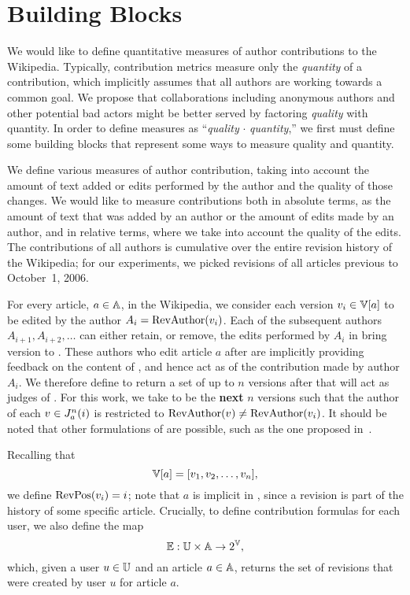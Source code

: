 \section{Building Blocks}

We would like to define quantitative measures of author 
contributions to the Wikipedia.
Typically, contribution metrics measure only the
\textit{quantity} of a contribution,
which implicitly assumes that all authors
are working towards a common goal.
We propose that collaborations including anonymous
authors and other potential bad actors might be better served by factoring
\textit{quality} with quantity.
In order to define measures as
``\textit{quality} $\cdot$ \textit{quantity},''
we first must define some building blocks that represent
some ways to measure quality and quantity.

We define various measures of author contribution, taking into
account the amount of text added or edits performed by the author
and the quality of those changes.
We would like to measure contributions both in absolute terms,
as the amount of text that was added by an author or the
amount of edits made by an author, and in relative terms, 
where we take into account the quality of the edits.
The contributions of all authors is cumulative over the 
entire revision history of the Wikipedia;
for our experiments, we picked revisions of all articles
previous to October~1, 2006.

For every article, $a \in \mathbb{A}$, in the Wikipedia,
we consider each version $\version{i} \in \versions{a}$
to be edited by the author $A_i = \mathrm{RevAuthor}(v_{i})$.
Each of the subsequent authors $A_{i+1}, A_{i+2}, \ldots$ can either
retain, or remove, the edits performed by $A_i$ in bring
version  to .
These authors who edit article $a$ after 
are implicitly providing feedback on the content of , and hence
act as  of the contribution made by author $A_i$.
We therefore define  to return a set of up to $n$ versions
after  that will act as judges of .
For this work, we take  to be the \textbf{next} $n$
versions such that the author of each $v_{} \in J_{a}^{n}(i)$
is restricted to $\mathrm{RevAuthor}(v_{}) \ne \mathrm{RevAuthor}(v_{i})$.
It should be noted that other formulations of 
are possible, such as the one proposed in~\cite{AISec08}.

Recalling that
\begin{equation*}
    \versions{a} = [ \version{1}, \version{2}, \ldots, \version{n} ],
\end{equation*}
we define $\mathrm{RevPos}(v_{i}) = i$;
note that $a$ is implicit in , since a revision
is part of the history of some specific article.
Crucially, to define contribution formulas for each user,
we also define the map
\begin{equation*}
\authorrevs{} : \users \times \articles \to 2^\versions{},
\end{equation*}
which, given a user $u \in \mathbb{U}$ and an article $a \in \mathbb{A}$, returns
the set of revisions that were created by user $u$ for article $a$.


